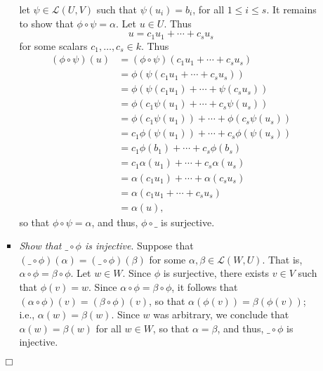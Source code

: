 \documentclass[9pt]{article}
\newcommand{\qed}{\hfill \ensuremath{\Box}}
\begin{document}
\begin{enumerate}
\begin{enumerate}
\begin{itemize}
                        let $\psi \in \mathcal{L}(U, V)$ such that
                        $\psi(u_i) = b_i$, for all $1 \le i \le s$. It remains
                        to show that $\phi\circ\psi = \alpha$. Let $u \in U$.
                        Thus
                        $$u = c_1u_1 + \cdots + c_su_s$$
                        for some scalars $c_1, \ldots, c_s \in k$. Thus
                        \begin{align*}
                           (\phi\circ\psi)(u) &= (\phi\circ\psi)(
                              c_1u_1 + \cdots + c_su_s) \\
                              &= \phi(\psi(c_1u_1 + \cdots + c_su_s)) \\
                              &= \phi(\psi(c_1u_1) + \cdots + \psi(c_su_s)) \\
                              &= \phi(c_1\psi(u_1) + \cdots + c_s\psi(u_s)) \\
                              &= \phi(c_1\psi(u_1))+\cdots+\phi(c_s\psi(u_s)) \\
                              &= c_1\phi(\psi(u_1))+\cdots+c_s\phi(\psi(u_s)) \\
                              &= c_1\phi(b_1)+\cdots+c_s\phi(b_s) \\
                              &= c_1\alpha(u_1)+\cdots+c_s\alpha(u_s) \\
                              &= \alpha(c_1u_1)+\cdots+\alpha(c_su_s) \\
                              &= \alpha(c_1u_1+\cdots+c_su_s) \\
                              &= \alpha(u),
                        \end{align*}
                        so that $\phi\circ\psi = \alpha$, and thus,
                        $\phi\circ\_$ is surjective.
                  \item \textit{Show that $\_\circ\phi$ is injective}. Suppose
                        that $(\_\circ\phi)(\alpha) = (\_\circ\phi)(\beta)$ for
                        some $\alpha, \beta \in \mathcal{L}(W, U)$. That is,
                        $\alpha\circ\phi = \beta\circ\phi$. Let $w \in W$. Since
                        $\phi$ is surjective, there exists $v \in V$ such that
                        $\phi(v) = w$. Since $\alpha\circ\phi = \beta\circ\phi$,
                        it follows that
                        $(\alpha\circ\phi)(v) = (\beta\circ\phi)(v)$, so that
                        $\alpha(\phi(v)) = \beta(\phi(v))$; i.e.,
                        $\alpha(w) = \beta(w)$. Since $w$ was arbitrary, we
                        conclude that $\alpha(w) = \beta(w)$ for all $w \in W$,
                        so that $\alpha = \beta$, and thus, $\_\circ\phi$ is
                        injective.
               \end{itemize} \qed
      \end{enumerate}
\end{enumerate}
\end{document}
